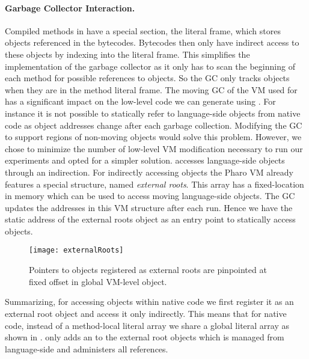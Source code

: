 \paragraph{Garbage Collector Interaction.}

Compiled methods in \PH have a special section, the literal frame, which stores objects referenced in the bytecodes.
Bytecodes then only have indirect access to these objects by indexing into the literal frame.
This simplifies the implementation of the garbage collector as it only has to scan the beginning of each method for possible references to objects. 
So the GC only tracks \ST objects when they are in the method literal frame. 
The moving GC of the VM used for \PH has a significant impact on the low-level code we can generate using \B.
For instance it is not possible to statically refer to language-side objects from native code as object addresses change after each garbage collection.
Modifying the GC to support regions of non-moving objects would solve this problem.
However, we chose to minimize the number of low-level VM modification necessary to run our experiments and opted for a simpler solution.
\B accesses language-side objects through an indirection.
For indirectly accessing objects the Pharo VM already features a special structure, named \emph{external roots}.
This array has a fixed-location in memory which can be used to access moving language-side objects.
The GC updates the addresses in this VM structure after each run.
Hence we have the static address of the external roots object as an entry point to statically access \ST objects.
%
\begin{figure}[ht]
	\centering
	\texttt{[image: externalRoots]}
	\caption{Pointers to objects registered as external roots are pinpointed at fixed offset in global VM-level object.
	}
\end{figure}
%
Summarizing, for accessing \ST objects within native code we first register it as an external root object and access it only indirectly.
This means that for native code, instead of a method-local literal array we share a global literal array as shown in . 
\B only adds an  to the external root objects which is managed from language-side and administers all references.

